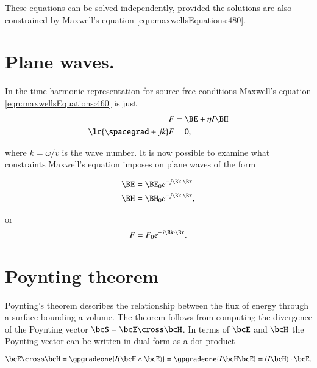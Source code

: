 These equations can be solved independently, provided the solutions are also constrained by Maxwell's equation \cref{eqn:maxwellsEquations:480}.

\section{Plane waves.}

In the time harmonic representation for source free conditions Maxwell's equation \cref{eqn:maxwellsEquations:460} is just
\begin{dmath}\label{eqn:maxwellsEquations:560}
\begin{aligned}
F &= \BE + \eta I \BH \\
\lr{ \spacegrad + j k } F &= 0,
\end{aligned}
\end{dmath}

where \( k = \omega/v \) is the wave number.  It is now possible to examine what constraints Maxwell's equation imposes on plane waves of the form

\begin{dmath}\label{eqn:maxwellsEquations:580}
\begin{aligned}
\BE &= \BE_0 e^{-j \Bk \cdot \Bx} \\
\BH &= \BH_0 e^{-j \Bk \cdot \Bx},
\end{aligned}
\end{dmath}

or
\begin{dmath}\label{eqn:maxwellsEquations:600}
F = F_0 e^{-j \Bk \cdot \Bx}.
\end{dmath}



\section{Poynting theorem}

Poynting's theorem describes the relationship between the flux of energy through a surface bounding a volume.
The theorem follows from computing the divergence of the Poynting vector \( \bcS = \bcE \cross \bcH \).  In terms of \( \bcE \) and \( \bcH \) the Poynting vector can be written in dual form as a dot product

\begin{equation}\label{eqn:maxwellsEquations:780}
\bcE \cross \bcH
=
\gpgradeone{ I (\bcH \wedge \bcE) }
=
\gpgradeone{ I \bcH \bcE }
=
(I \bcH) \cdot \bcE.
\end{equation}

